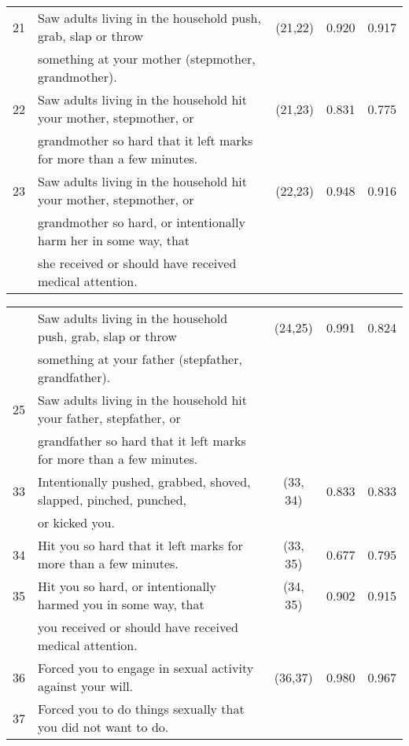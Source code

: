 \documentclass[letterpaper,man,natbib]{apa6}  %
\begin{document}
\begin{table}
\begin{tabular*}{\textwidth}{clccc}
\midrule
21 & {\small Saw adults living in the household push, grab, slap or throw} & (21,22) & 0.920 & 0.917 \\
& {\small something at your mother (stepmother, grandmother).} & \\
22 & {\small Saw adults living in the household hit your mother, stepmother, or} & (21,23) & 0.831 & 0.775 \\
& {\small grandmother so hard that it left marks for more than a few minutes.} & \\
23 & {\small Saw adults living in the household hit your mother, stepmother, or} & (22,23) & 0.948 & 0.916 \\
& {\small grandmother so hard, or intentionally harm her in some way, that} & \\
& {\small she received or should have received medical attention.} & \\
\midrule
\end{tabular*}
\end{table}

\begin{table}[ht!]
\begin{tabular}{clccc}
\centering
24 & {\small Saw adults living in the household push, grab, slap or throw} & (24,25) & 0.991 & 0.824 \\
& {\small something at your father (stepfather, grandfather).} & \\
25 & {\small Saw adults living in the household hit your father, stepfather, or} & \\
& {\small grandfather so hard that it left marks for more than a few minutes.} & \\
\midrule
33 & {\small Intentionally pushed, grabbed, shoved, slapped, pinched, punched,} & (33, 34) & 0.833 & 0.833 \\
& {\small or kicked you.} & \\
34 & {\small Hit you so hard that it left marks for more than a few minutes.} & (33, 35) & 0.677 & 0.795 \\
35 & {\small Hit you so hard, or intentionally harmed you in some way, that} & (34, 35) & 0.902 & 0.915 \\
& {\small you received or should have received medical attention.} & \\
\midrule
36 & {\small Forced you to engage in sexual activity against your will.} & (36,37) & 0.980 & 0.967 \\
37 & {\small Forced you to do things sexually that you did not want to do.} & \\
\bottomrule
\end{tabular}
\end{table}
\end{document}
